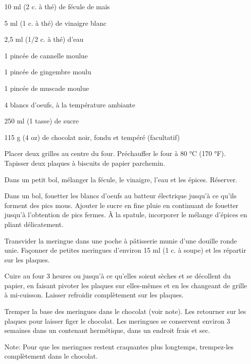 


\totaltime{}


\begin{ingredients}
    \item 10 ml (2 c. à thé) de fécule de maïs
    \item 5 ml (1 c. à thé) de vinaigre blanc
    \item 2,5 ml (1/2 c. à thé) d’eau
    \item 1 pincée de cannelle moulue
    \item 1 pincée de gingembre moulu
    \item 1 pincée de muscade moulue
    \item 4 blancs d’oeufs, à la température ambiante
    \item 250 ml (1 tasse) de sucre
    \item 115 g (4 oz) de chocolat noir, fondu et tempéré (facultatif)
\end{ingredients}

\begin{steps}
    \item Placer deux grilles au centre du four. Préchauffer le four à 80 °C (170 °F). Tapisser deux plaques à biscuits de papier parchemin.
    \item Dans un petit bol, mélanger la fécule, le vinaigre, l’eau et les épices. Réserver.
    \item Dans un bol, fouetter les blancs d’oeufs au batteur électrique jusqu’à ce qu’ils forment des pics mous. Ajouter le sucre en fine pluie en continuant de fouetter jusqu’à l’obtention de pics fermes. À la spatule, incorporer le mélange d’épices en pliant délicatement.
    \item Transvider la meringue dans une poche à pâtisserie munie d’une douille ronde unie. Façonner de petites meringues d’environ 15 ml (1 c. à soupe) et les répartir sur les plaques.
    \item Cuire au four 3 heures ou jusqu’à ce qu’elles soient sèches et se décollent du papier, en faisant pivoter les plaques sur elles-mêmes et en les changeant de grille à mi-cuisson. Laisser refroidir complètement sur les plaques.
    \item Tremper la base des meringues dans le chocolat (voir note). Les retourner sur les plaques pour laisser figer le chocolat. Les meringues se conservent environ 3 semaines dans un contenant hermétique, dans un endroit frais et sec.
    \item Note: Pour que les meringues restent craquantes plus longtemps, trempez-les complètement dans le chocolat.
\end{steps}
